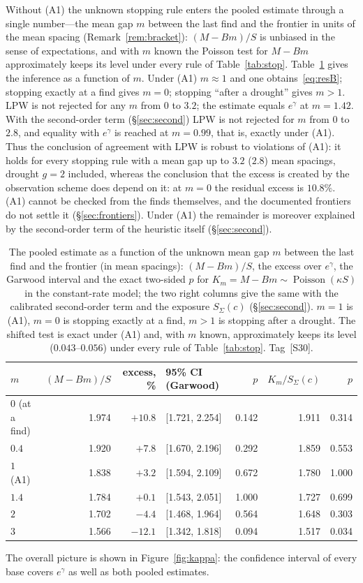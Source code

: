 \documentclass[11pt,a4paper]{article}
\theoremstyle{plain}
\theoremstyle{remark}
\newcommand{\eg}{e^{\gamma}}
\DeclareMathOperator{\Pois}{Poisson}
\begin{document}
Without (A1) the unknown stopping rule enters the pooled estimate through a single
number---the mean gap $m$ between the last find and the frontier in units of the
mean spacing (Remark~\ref{rem:bracket}): $(M-Bm)/S$ is unbiased in the sense of
expectations, and with $m$ known the Poisson test for $M-Bm$ approximately keeps
its level under every rule of Table~\ref{tab:stop}. Table~\ref{tab:mfamily} gives the inference as a function of
$m$. Under (A1) $m\approx1$ and one obtains~\eqref{eq:resB}; stopping exactly at a
find gives $m=0$; stopping ``after a drought'' gives $m>1$. LPW is not rejected
for any $m$ from $0$ to $3.2$; the estimate equals $\eg$ at $m=1.42$. With the
second-order term (\S\ref{sec:second}) LPW is not rejected for $m$ from $0$ to
$2.8$, and equality with $\eg$ is reached at $m=0.99$, that is, exactly under
(A1). Thus the conclusion of agreement with LPW is robust to violations of (A1): it holds
for every stopping rule with a mean gap up to $3.2$ ($2.8$) mean spacings, drought
$g=2$ included, whereas the conclusion that the excess is created by the
observation scheme does depend on it: at
$m=0$ the residual excess is $10.8\%$. (A1) cannot be checked from the finds
themselves, and the documented frontiers do not settle it
(\S\ref{sec:frontiers}). Under (A1) the remainder is moreover explained by the
second-order term of the heuristic itself (\S\ref{sec:second}).

\begin{table}[t]
\centering
\caption{The pooled estimate as a function of the unknown mean gap $m$ between the
last find and the frontier (in mean spacings): $(M-Bm)/S$, the excess over $\eg$, the
Garwood interval and the exact two-sided $p$ for $K_m=M-Bm\sim\Pois(\kappa S)$ in the
constant-rate model; the two right columns give the same with the calibrated
second-order term and the exposure $S_\Sigma(c)$ (\S\ref{sec:second}). $m=1$ is (A1),
$m=0$ is stopping exactly at a find, $m>1$ is stopping after a drought. The shifted
test is exact under (A1) and, with $m$ known, approximately keeps its level
($0.043$--$0.056$) under every rule of Table~\ref{tab:stop}. Tag~[S30].}
\label{tab:mfamily}
\small
\begin{tabular}{lrrlrrr}
\toprule
$m$ & $(M-Bm)/S$ & excess, \% & 95\% CI (Garwood) & $p$ & $K_m/S_\Sigma(c)$ & $p$\\
\midrule
$0$ (at a find) & 1.974 & $+10.8$ & [1.721, 2.254] & 0.142 & 1.911 & 0.314\\
$0.4$ & 1.920 & $+7.8$ & [1.670, 2.196] & 0.292 & 1.859 & 0.553\\
$1$ (A1) & 1.838 & $+3.2$ & [1.594, 2.109] & 0.672 & 1.780 & 1.000\\
$1.4$ & 1.784 & $+0.1$ & [1.543, 2.051] & 1.000 & 1.727 & 0.699\\
$2$ & 1.702 & $-4.4$ & [1.468, 1.964] & 0.564 & 1.648 & 0.303\\
$3$ & 1.566 & $-12.1$ & [1.342, 1.818] & 0.094 & 1.517 & 0.034\\
\bottomrule
\end{tabular}
\end{table} The overall picture is shown in
Figure~\ref{fig:kappa}: the confidence interval of every base covers $\eg$ as
well as both pooled estimates.
\end{document}
